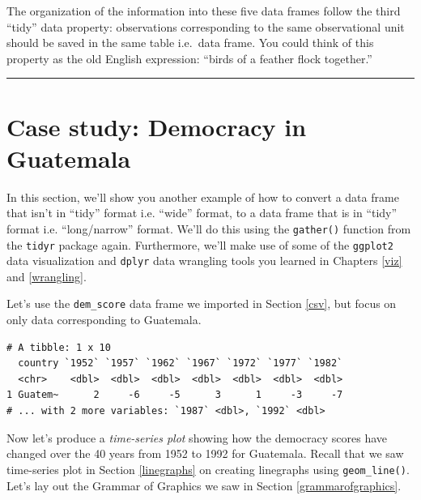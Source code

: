 \documentclass[12pt, krantz2,]{krantz}
\makeatletter
\newenvironment{Shaded}{\begin{snugshade}}{\end{snugshade}}
\newcommand{\KeywordTok}[1]{\textcolor[rgb]{0.27,0.27,0.27}{\textbf{#1}}}
\newcommand{\NormalTok}[1]{#1}
\newcommand{\OperatorTok}[1]{\textcolor[rgb]{0.43,0.43,0.43}{\textbf{#1}}}
\newcommand{\StringTok}[1]{\textcolor[rgb]{0.5,0.5,0.5}{#1}}
\newenvironment{kframe}{%
\medskip{}
\setlength{\fboxsep}{.8em}
 \def\at@end@of@kframe{}%
 \ifinner\ifhmode%
  \def\at@end@of@kframe{\end{minipage}}%
  \begin{minipage}{\columnwidth}%
 \fi\fi%
 \def\FrameCommand##1{\hskip\@totalleftmargin \hskip-\fboxsep
 \colorbox{shadecolor}{##1}\hskip-\fboxsep
     \hskip-\linewidth \hskip-\@totalleftmargin \hskip\columnwidth}%
 \MakeFramed {\advance\hsize-\width
   \@totalleftmargin\z@ \linewidth\hsize
   \@setminipage}}%
 {\par\unskip\endMakeFramed%
 \at@end@of@kframe}
\renewenvironment{Shaded}{\begin{kframe}}{\end{kframe}}
\makeatother
\begin{document}
The organization of the information into these five data frames follow the third ``tidy'' data property: observations corresponding to the same observational unit should be saved in the same table i.e.~data frame. You could think of this property as the old English expression: ``birds of a feather flock together.''

\begin{center}\rule{0.5\linewidth}{\linethickness}\end{center}

\hypertarget{case-study-tidy}{%
\section{Case study: Democracy in Guatemala}\label{case-study-tidy}}

In this section, we'll show you another example of how to convert a data frame that isn't in ``tidy'' format i.e. ``wide'' format, to a data frame that is in ``tidy'' format i.e. ``long/narrow'' format. We'll do this using the \texttt{gather()} function from the \texttt{tidyr} package again. Furthermore, we'll make use of some of the \texttt{ggplot2} data visualization and \texttt{dplyr} data wrangling tools you learned in Chapters \ref{viz} and \ref{wrangling}.

Let's use the \texttt{dem\_score} data frame we imported in Section \ref{csv}, but focus on only data corresponding to Guatemala.

\begin{Shaded}
\end{Shaded}

\begin{verbatim}
# A tibble: 1 x 10
  country `1952` `1957` `1962` `1967` `1972` `1977` `1982`
  <chr>    <dbl>  <dbl>  <dbl>  <dbl>  <dbl>  <dbl>  <dbl>
1 Guatem~      2     -6     -5      3      1     -3     -7
# ... with 2 more variables: `1987` <dbl>, `1992` <dbl>
\end{verbatim}

Now let's produce a \emph{time-series plot} showing how the democracy scores have changed over the 40 years from 1952 to 1992 for Guatemala. Recall that we saw time-series plot in Section \ref{linegraphs} on creating linegraphs using \texttt{geom\_line()}. Let's lay out the Grammar of Graphics we saw in Section \ref{grammarofgraphics}.
\end{document}
